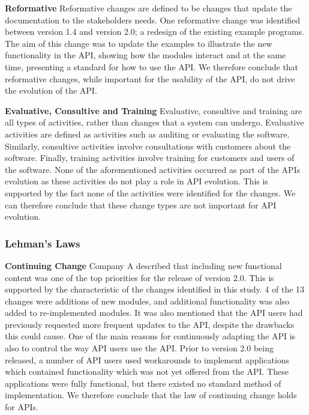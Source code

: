 \documentclass{sig-alternate}
\begin{document}
\smallskip \noindent
\textbf{Reformative  }
Reformative changes are defined to be changes that update the documentation to the stakeholders needs.
One reformative change was identified between version 1.4 and version 2.0; a redesign of the existing example programs. The aim of this change was to update the examples to illustrate the new functionality in the API, showing how the modules interact and at the same time, presenting a standard for how to use the API.
We therefore conclude that reformative changes, while important for the usability of the API, do not drive the evolution of the API.

\smallskip \noindent
\textbf{Evaluative, Consultive and Training  }
Evaluative, consultive and training are all types of activities, rather than changes that a system can undergo. Evaluative activities are defined as activities such as auditing or evaluating the software. Similarly, consultive activities involve consultations with customers about the software. Finally, training activities involve training for customers and users of the software.
None of the aforementioned activities occurred as part of the APIs evolution as these activities do not play a role in API evolution. This is supported by the fact none of the activities were identified for the changes.
We can therefore conclude that these change types are not important for API evolution.


\subsubsection{Lehman's Laws} 

\smallskip \noindent
\textbf{Continuing Change  } 
Company A described that including new functional content was one of the top priorities for the release of version 2.0. This is supported by the characteristic of the changes identified in this study. 4 of the 13 changes were additions of new modules, and additional functionality was also added to re-implemented modules. It was also mentioned that the API users had previously requested more frequent updates to the API, despite the drawbacks this could cause. One of the main reasons for continuously adapting the API is also to control the way API users use the API. Prior to version 2.0 being released, a number of API users used workarounds to implement applications which contained functionality which was not yet offered from the API. These applications were fully functional, but there existed no standard method of implementation. We therefore conclude that the law of continuing change holds for APIs. 
\end{document}
